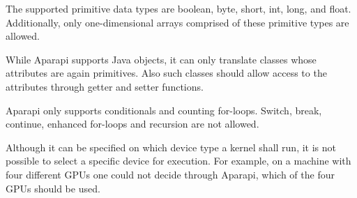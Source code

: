 \begin{description}[style=nextline]
  \item [Data Types]
  The supported primitive data types are boolean, byte, short, int, long, and float. Additionally, only one-dimensional arrays comprised of these primitive types are allowed.

  \item [Object Orientation]
  While Aparapi supports Java objects, it can only translate classes whose attributes are again primitives. Also such classes should allow access to the attributes through getter and setter functions.

  \item [Control Flow]
  Aparapi only supports conditionals and counting for-loops. Switch, break, continue, enhanced for-loops and recursion are not allowed.

  \item [Specific Device Choice]
  Although it can be specified on which device type a kernel shall run, it is not possible to select a specific device for execution. For example, on a machine with four different GPUs one could not decide through Aparapi, which of the four GPUs should be used.
\end{description}
